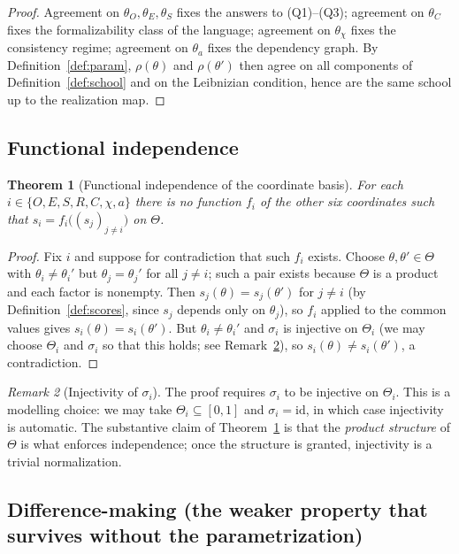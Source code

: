 \documentclass[11pt]{article}
\newtheorem{theorem}{Theorem}[section]
\theoremstyle{definition}
\theoremstyle{remark}
\newtheorem{remark}[theorem]{Remark}
\newcommand{\Th}{\Theta}
\begin{document}
\begin{proof}
Agreement on $\theta_O,\theta_E,\theta_S$ fixes the answers to (Q1)--(Q3); agreement on $\theta_C$ fixes the formalizability class of the language; agreement on $\theta_\chi$ fixes the consistency regime; agreement on $\theta_a$ fixes the dependency graph. By Definition~\ref{def:param}, $\rho(\theta)$ and $\rho(\theta')$ then agree on all components of Definition~\ref{def:school} and on the Leibnizian condition, hence are the same school up to the realization map.
\end{proof}

\subsection{Functional independence}

\begin{theorem}[Functional independence of the coordinate basis]\label{thm:indep}
For each $i\in\{O,E,S,R,C,\chi,a\}$ there is no function $f_i$ of the other six coordinates such that $s_i=f_i\bigl((s_j)_{j\ne i}\bigr)$ on $\Th$.
\end{theorem}

\begin{proof}
Fix $i$ and suppose for contradiction that such $f_i$ exists. Choose $\theta,\theta'\in\Th$ with $\theta_i\ne\theta_i'$ but $\theta_j=\theta_j'$ for all $j\ne i$; such a pair exists because $\Th$ is a product and each factor is nonempty. Then $s_j(\theta)=s_j(\theta')$ for $j\ne i$ (by Definition~\ref{def:scores}, since $s_j$ depends only on $\theta_j$), so $f_i$ applied to the common values gives $s_i(\theta)=s_i(\theta')$. But $\theta_i\ne\theta_i'$ and $\sigma_i$ is injective on $\Th_i$ (we may choose $\Th_i$ and $\sigma_i$ so that this holds; see Remark~\ref{rem:injective}), so $s_i(\theta)\ne s_i(\theta')$, a contradiction.
\end{proof}

\begin{remark}[Injectivity of $\sigma_i$]\label{rem:injective}
The proof requires $\sigma_i$ to be injective on $\Th_i$. This is a modelling choice: we may take $\Th_i\subseteq[0,1]$ and $\sigma_i=\mathrm{id}$, in which case injectivity is automatic. The substantive claim of Theorem~\ref{thm:indep} is that the \emph{product structure} of $\Th$ is what enforces independence; once the structure is granted, injectivity is a trivial normalization.
\end{remark}

\subsection{Difference-making (the weaker property that survives without the parametrization)}
\end{document}
